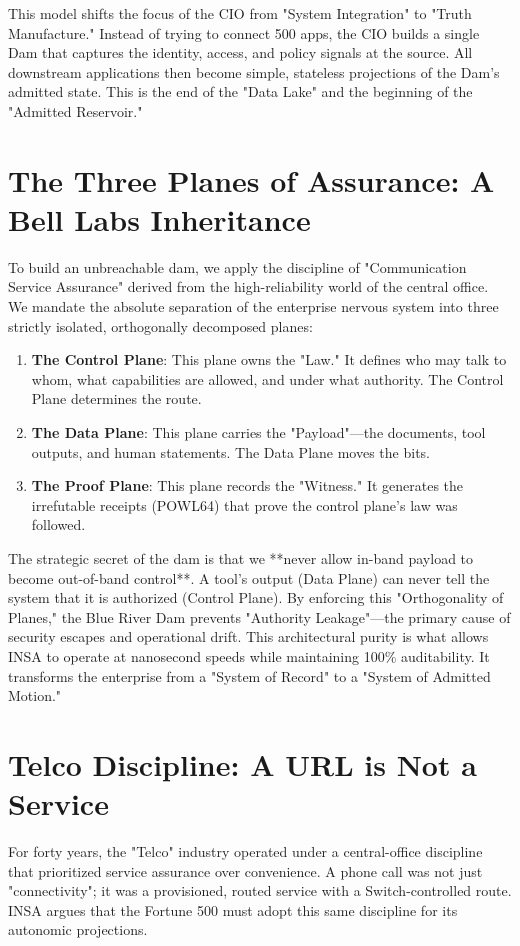 \documentclass[12pt,a4paper,oneside]{book}
\begin{document}
This model shifts the focus of the CIO from "System Integration" to "Truth Manufacture." Instead of trying to connect 500 apps, the CIO builds a single Dam that captures the identity, access, and policy signals at the source. All downstream applications then become simple, stateless projections of the Dam's admitted state. This is the end of the "Data Lake" and the beginning of the "Admitted Reservoir."

\section{The Three Planes of Assurance: A Bell Labs Inheritance}
To build an unbreachable dam, we apply the discipline of "Communication Service Assurance" derived from the high-reliability world of the central office. We mandate the absolute separation of the enterprise nervous system into three strictly isolated, orthogonally decomposed planes:

\begin{enumerate}
    \item \textbf{The Control Plane}: This plane owns the "Law." It defines who may talk to whom, what capabilities are allowed, and under what authority. The Control Plane determines the route.
    \item \textbf{The Data Plane}: This plane carries the "Payload"---the documents, tool outputs, and human statements. The Data Plane moves the bits.
    \item \textbf{The Proof Plane}: This plane records the "Witness." It generates the irrefutable receipts (POWL64) that prove the control plane's law was followed.
\end{enumerate}

The strategic secret of the dam is that we **never allow in-band payload to become out-of-band control**. A tool's output (Data Plane) can never tell the system that it is authorized (Control Plane). By enforcing this "Orthogonality of Planes," the Blue River Dam prevents "Authority Leakage"---the primary cause of security escapes and operational drift. This architectural purity is what allows INSA to operate at nanosecond speeds while maintaining 100\% auditability. It transforms the enterprise from a "System of Record" to a "System of Admitted Motion."

\section{Telco Discipline: A URL is Not a Service}
For forty years, the "Telco" industry operated under a central-office discipline that prioritized service assurance over convenience. A phone call was not just "connectivity"; it was a provisioned, routed service with a Switch-controlled route. INSA argues that the Fortune 500 must adopt this same discipline for its autonomic projections. 
\end{document}
